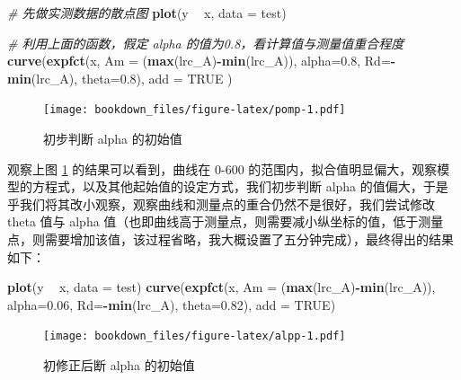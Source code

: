\documentclass[]{krantz}
\makeatletter
\newenvironment{Shaded}{\begin{snugshade}}{\end{snugshade}}
\newcommand{\KeywordTok}[1]{\textcolor[rgb]{0.13,0.29,0.53}{\textbf{#1}}}
\newcommand{\DataTypeTok}[1]{\textcolor[rgb]{0.13,0.29,0.53}{#1}}
\newcommand{\FloatTok}[1]{\textcolor[rgb]{0.00,0.00,0.81}{#1}}
\newcommand{\StringTok}[1]{\textcolor[rgb]{0.31,0.60,0.02}{#1}}
\newcommand{\CommentTok}[1]{\textcolor[rgb]{0.56,0.35,0.01}{\textit{#1}}}
\newcommand{\OtherTok}[1]{\textcolor[rgb]{0.56,0.35,0.01}{#1}}
\newcommand{\OperatorTok}[1]{\textcolor[rgb]{0.81,0.36,0.00}{\textbf{#1}}}
\newcommand{\NormalTok}[1]{#1}
\newenvironment{kframe}{%
\medskip{}
\setlength{\fboxsep}{.8em}
 \def\at@end@of@kframe{}%
 \ifinner\ifhmode%
  \def\at@end@of@kframe{\end{minipage}}%
  \begin{minipage}{\columnwidth}%
 \fi\fi%
 \def\FrameCommand##1{\hskip\@totalleftmargin \hskip-\fboxsep
 \colorbox{shadecolor}{##1}\hskip-\fboxsep
     \hskip-\linewidth \hskip-\@totalleftmargin \hskip\columnwidth}%
 \MakeFramed {\advance\hsize-\width
   \@totalleftmargin\z@ \linewidth\hsize
   \@setminipage}}%
 {\par\unskip\endMakeFramed%
 \at@end@of@kframe}
\renewenvironment{Shaded}{\begin{kframe}}{\end{kframe}}
\theoremstyle{definition}
\theoremstyle{definition}
\theoremstyle{definition}
\theoremstyle{remark}
\makeatother
\begin{document}
\begin{Shaded}
\begin{Highlighting}[]
\CommentTok{# 先做实测数据的散点图}
\KeywordTok{plot}\NormalTok{(y }\OperatorTok{~}\StringTok{ }\NormalTok{x, }\DataTypeTok{data =}\NormalTok{ test)}

\CommentTok{# 利用上面的函数，假定 alpha 的值为0.8，看计算值与测量值重合程度}
\KeywordTok{curve}\NormalTok{(}\KeywordTok{expfct}\NormalTok{(x, }\DataTypeTok{Am =}\NormalTok{ (}\KeywordTok{max}\NormalTok{(lrc_A)}\OperatorTok{-}\KeywordTok{min}\NormalTok{(lrc_A)),}
     \DataTypeTok{alpha=}\FloatTok{0.8}\NormalTok{, }\DataTypeTok{Rd=}\OperatorTok{-}\KeywordTok{min}\NormalTok{(lrc_A), }\DataTypeTok{theta=}\FloatTok{0.8}\NormalTok{), }\DataTypeTok{add =} \OtherTok{TRUE}
\NormalTok{             )}
\end{Highlighting}
\end{Shaded}

\begin{figure}
\centering
\texttt{[image: bookdown\_files/figure-latex/pomp-1.pdf]}
\caption{\label{fig:pomp}初步判断 alpha 的初始值}
\end{figure}

观察上图 \ref{fig:pomp} 的结果可以看到，曲线在 0-600
的范围内，拟合值明显偏大，观察模型的方程式，以及其他起始值的设定方式，我们初步判断
alpha
的值偏大，于是乎我们将其改小观察，观察曲线和测量点的重合仍然不是很好，我们尝试修改
theta 值与 alpha
值（也即曲线高于测量点，则需要减小纵坐标的值，低于测量点，则需要增加该值，该过程省略，我大概设置了五分钟完成），最终得出的结果如下：

\begin{Shaded}
\begin{Highlighting}[]
\KeywordTok{plot}\NormalTok{(y }\OperatorTok{~}\StringTok{ }\NormalTok{x, }\DataTypeTok{data =}\NormalTok{ test)}
\KeywordTok{curve}\NormalTok{(}\KeywordTok{expfct}\NormalTok{(x, }\DataTypeTok{Am =}\NormalTok{ (}\KeywordTok{max}\NormalTok{(lrc_A)}\OperatorTok{-}\KeywordTok{min}\NormalTok{(lrc_A)),}
     \DataTypeTok{alpha=}\FloatTok{0.06}\NormalTok{, }\DataTypeTok{Rd=}\OperatorTok{-}\KeywordTok{min}\NormalTok{(lrc_A), }\DataTypeTok{theta=}\FloatTok{0.82}\NormalTok{), }\DataTypeTok{add =} \OtherTok{TRUE}\NormalTok{)}
\end{Highlighting}
\end{Shaded}

\begin{figure}
\centering
\texttt{[image: bookdown\_files/figure-latex/alpp-1.pdf]}
\caption{\label{fig:alpp}初修正后断 alpha 的初始值}
\end{figure}
\end{document}
